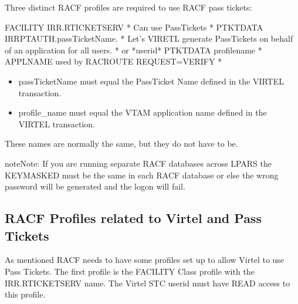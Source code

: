 \documentclass[letterpaper,10pt,english]{sphinxmanual}
\begin{document}
\sphinxAtStartPar
Three distinct RACF profiles are required to use RACF pass tickets:\sphinxhyphen{}

\begin{sphinxVerbatim}[commandchars=\\\{\}]
FACILITY IRR.RTICKETSERV           * Can use PassTickets *
PTKTDATA IRRPTAUTH.passTicketName. * Let’s VIRETL generate PassTickets on behalf of an application for all users. * or *userid*
PTKTDATA profile\PYGZus{}name              * APPLNAME used by RACROUTE REQUEST=VERIFY *
\end{sphinxVerbatim}

\sphinxAtStartPar
{}
\begin{itemize}
\item {} 
\sphinxAtStartPar
passTicketName must equal the PassTicket Name defined in the VIRTEL transaction.

\item {} 
\sphinxAtStartPar
profile\_name must equal the VTAM application name defined in the VIRTEL transaction.

\end{itemize}

\sphinxAtStartPar
These names are normally the same, but they do not have to be.

\begin{sphinxadmonition}{note}{Note:}
\sphinxAtStartPar
If you are running separate RACF databases across LPARS the KEYMASKED must be the same in each RACF database or else the wrong password will be generated and the logon will fail.
\end{sphinxadmonition}

\newpage


\subsection{RACF Profiles related to Virtel and Pass Tickets}
\label{\detokenize{connectivity_guide:racf-profiles-related-to-virtel-and-pass-tickets}}
\sphinxAtStartPar
As mentioned RACF needs to have some profiles set up to allow Virtel to use Pass Tickets. The first profile is the FACILITY Class profile with the IRR.RTICKETSERV name. The Virtel STC userid must have READ access to this profile.

\sphinxAtStartPar
{} 

\begin{sphinxVerbatim}[commandchars=\\\{\}]
  
    
\end{sphinxVerbatim}
\end{document}
